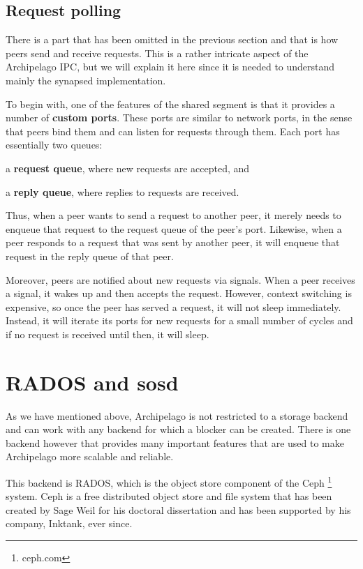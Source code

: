 \subsection{Request polling}\label{sec:arch-poll}

There is a part that has been omitted in the previous section and that is how 
peers send and receive requests. This is a rather intricate aspect of the 
Archipelago IPC, but we will explain it here since it is needed to understand 
mainly the synapsed implementation.

To begin with, one of the features of the shared segment is that it provides a 
number of \textbf{custom ports}. These ports are similar to network ports, in 
the sense that peers bind them and can listen for requests through them. Each 
port has essentially two queues:
\begin{inparaenum}[i)]
\item a \textbf{request queue}, where new requests are accepted, and
\item a \textbf{reply queue}, where replies to requests are received.
\end{inparaenum}

Thus, when a peer wants to send a request to another peer, it merely needs to 
enqueue that request to the request queue of the peer's port. Likewise, when a 
peer responds to a request that was sent by another peer, it will enqueue that 
request in the reply queue of that peer.

Moreover, peers are notified about new requests via signals. When a peer 
receives a signal, it wakes up and then accepts the request. However, context 
switching is expensive, so once the peer has served a request, it will not 
sleep immediately. Instead, it will iterate its ports for new requests for a 
small number of cycles and if no request is received until then, it will sleep.

\section{RADOS and sosd}\label{sec:rados-archip}

As we have mentioned above, Archipelago is not restricted to a storage backend 
and can work with any backend for which a blocker can be created. There is one 
backend however that provides many important features that are used to make 
Archipelago more scalable and reliable.


This backend is RADOS\cite{rados}, which is the object store component of the 
Ceph \footnote{ceph.com} system. Ceph is a free distributed object store and 
file system that has been created by Sage Weil for his doctoral dissertation
\cite{weil-thesis} and has been supported by his company, Inktank, ever since.

